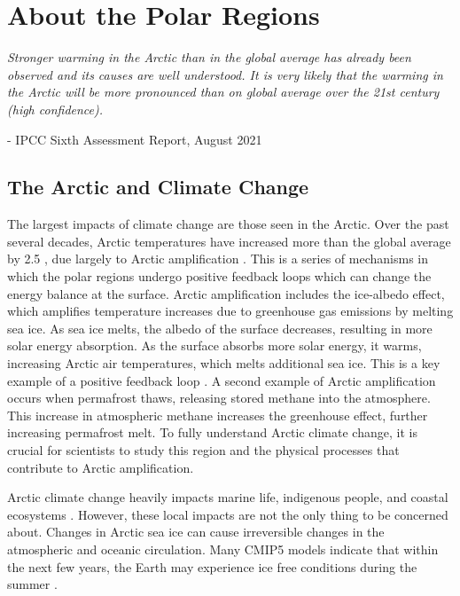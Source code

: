 \chapter{About the Polar Regions}

\noindent \emph{Stronger warming in the Arctic than in the global average has already been observed and its causes are well understood. It is very likely that the warming in the Arctic will be more pronounced than on global average over the 21st century (high confidence).}

\hspace{6 cm} - IPCC Sixth Assessment Report, August 2021

\section{The Arctic and Climate Change}
The largest impacts of climate change are those seen in the Arctic. Over the past several decades, Arctic temperatures have increased more than the global average by 2.5 \cite{tjernstrom:2014a}, due largely to Arctic amplification \cite{rantanen:2022}. This is a series of mechanisms in which the polar regions undergo positive feedback loops which can change the energy balance at the surface. Arctic amplification includes the ice-albedo effect, which amplifies temperature increases due to greenhouse gas emissions by melting sea ice. As sea ice melts, the albedo of the surface decreases, resulting in more solar energy absorption. As the surface absorbs more solar energy, it warms, increasing Arctic air temperatures, which melts additional sea ice. This is a key example of a positive feedback loop \cite{ipcc_techsum}. A second example of Arctic amplification occurs when permafrost thaws, releasing stored methane into the atmosphere. This increase in atmospheric methane increases the greenhouse effect, further increasing permafrost melt. To fully understand Arctic climate change, it is crucial for scientists to study this region and the physical processes that contribute to Arctic amplification.

Arctic climate change heavily impacts marine life, indigenous people, and coastal ecosystems \cite{ipcc_techsum}. However, these local impacts are not the only thing to be concerned about. Changes in Arctic sea ice can cause irreversible changes in the atmospheric and oceanic circulation. Many CMIP5 models indicate that within the next few years,  the Earth may experience ice free conditions during the summer \cite{stroeve:2018}.

